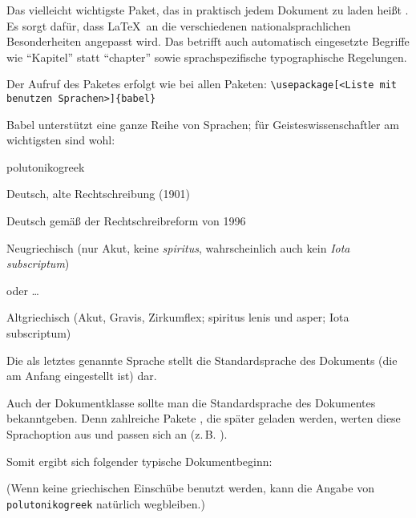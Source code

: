 
Das vielleicht wichtigste Paket, das in praktisch jedem Dokument zu laden heißt .
Es sorgt dafür, dass \LaTeX\ an die verschiedenen nationalsprachlichen Besonderheiten angepasst wird.
Das betrifft auch automatisch eingesetzte Begriffe wie \enquote{Kapitel} statt \enquote{chapter} sowie
sprachspezifische typographische Regelungen.

Der Aufruf des Paketes  erfolgt wie bei allen Paketen: 
\lstinline/\usepackage[<Liste mit benutzen Sprachen>]{babel}/ 

Babel unterstützt eine ganze Reihe von Sprachen; für Geisteswissenschaftler am wichtigsten sind
wohl:

\begin{labeling}{polutonikogreek}
 \item[german] Deutsch, alte Rechtschreibung (1901)
 \item[ngerman] Deutsch gemäß der Rechtschreibreform von 1996
 \item[greek] Neugriechisch (nur Akut, keine \emph{spiritus}, wahrscheinlich auch kein \emph{Iota subscriptum})
 \item[greek.ancient] oder \ldots 
 \item[polutonikogreek] Altgriechisch (Akut, Gravis, Zirkumflex; spiritus lenis und asper; Iota subscriptum)
\end{labeling}

Die als letztes genannte Sprache stellt die Standardsprache des Dokuments (die am Anfang
eingestellt ist) dar.

Auch der Dokumentklasse sollte man die Standardsprache des Dokumentes bekanntgeben.
Denn zahlreiche Pakete , die später geladen werden, werten diese Sprachoption aus und 
passen sich an (z.\,B. ).

Somit ergibt sich folgender typische Dokumentbeginn:


(Wenn keine griechischen Einschübe benutzt werden, kann die Angabe von \lstinline/polutonikogreek/
natürlich wegbleiben.)


